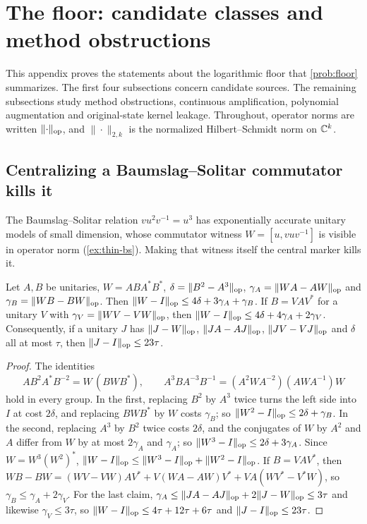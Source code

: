 \section{The floor: candidate classes and method obstructions}\label{app:floor}

This appendix proves the statements about the logarithmic floor that \cref{prob:floor} summarizes. The first four subsections concern candidate sources. The remaining subsections study method obstructions, continuous amplification, polynomial augmentation and original-state kernel leakage. Throughout,
operator norms are written $\lVert \cdot\rVert_{\mathrm{op}}$, and $\|\cdot\|_{2,k}$ is the normalized Hilbert--Schmidt norm on $\mathbb C^k$.

\subsection{Centralizing a Baumslag--Solitar commutator kills it}\label{app:floor-bs}

The Baumslag--Solitar relation $vu^2v^{-1}=u^3$ has exponentially accurate unitary models of small dimension, whose commutator
witness $W=[u,vuv^{-1}]$ is visible in operator norm (\cref{ex:thin-bs}). Making that witness itself the central marker kills it.

\begin{proposition}\label{prop:bs-central}
Let $A,B$ be unitaries, $W=ABA^*B^*$, $\delta=\lVert B^2-A^3\rVert_{\mathrm{op}}$, $\gamma_A=\lVert WA-AW\rVert_{\mathrm{op}}$ and $\gamma_B=\lVert WB-BW\rVert_{\mathrm{op}}$. Then
$\lVert W-I\rVert_{\mathrm{op}}\le4\delta+3\gamma_A+\gamma_B$. If $B=VAV^*$ for a unitary $V$ with $\gamma_V=\lVert WV-VW\rVert_{\mathrm{op}}$, then
$\lVert W-I\rVert_{\mathrm{op}}\le4\delta+4\gamma_A+2\gamma_V$. Consequently, if a unitary $J$ has $\lVert J-W\rVert_{\mathrm{op}}$, $\lVert JA-AJ\rVert_{\mathrm{op}}$, $\lVert JV-VJ\rVert_{\mathrm{op}}$ and $\delta$ all at
most $\tau$, then $\lVert J-I\rVert_{\mathrm{op}}\le23\tau$.
\end{proposition}

\begin{proof}
The identities
\[
AB^2A^*B^{-2}=W\,(BWB^*),\qquad A^3BA^{-3}B^{-1}=(A^2WA^{-2})(AWA^{-1})W
\]
hold in every group. In the first, replacing $B^2$
by $A^3$ twice turns the left side into $I$ at cost $2\delta$, and replacing $BWB^*$ by $W$ costs $\gamma_B$; so
$\lVert W^2-I\rVert_{\mathrm{op}}\le2\delta+\gamma_B$. In the second, replacing $A^3$ by $B^2$ twice costs $2\delta$, and the conjugates of $W$ by $A^2$ and $A$
differ from $W$ by at most $2\gamma_A$ and $\gamma_A$; so $\lVert W^3-I\rVert_{\mathrm{op}}\le2\delta+3\gamma_A$. Since $W=W^3(W^2)^*$,
$\lVert W-I\rVert_{\mathrm{op}}\le\lVert W^3-I\rVert_{\mathrm{op}}+\lVert W^2-I\rVert_{\mathrm{op}}$. If $B=VAV^*$, then
$WB-BW=(WV-VW)AV^*+V(WA-AW)V^*+VA(WV^*-V^*W)$, so $\gamma_B\le\gamma_A+2\gamma_V$. For the last claim, $\gamma_A\le\lVert JA-AJ\rVert_{\mathrm{op}}+2\lVert J-W\rVert_{\mathrm{op}}
\le3\tau$ and likewise $\gamma_V\le3\tau$, so $\lVert W-I\rVert_{\mathrm{op}}\le4\tau+12\tau+6\tau$ and $\lVert J-I\rVert_{\mathrm{op}}\le23\tau$.
\end{proof}

